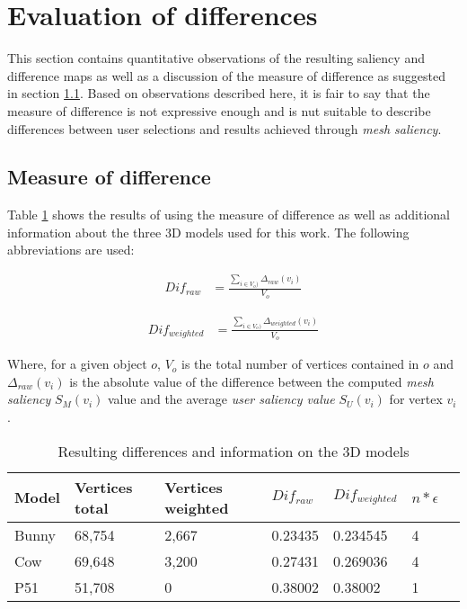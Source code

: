 	\section{Evaluation of differences}
	\label{sec:evaluation_of_differences}
This section contains quantitative observations of the resulting saliency and difference maps as well as a discussion of the measure of difference as suggested in section \ref{sec:measure_of_difference}. Based on observations described here, it is fair to say that the measure of difference is not expressive enough and is nut suitable to describe differences between user selections and results achieved through \textit{mesh saliency}.

		\subsection{Measure of difference}
		\label{sec:measure_of_difference}
Table \ref{tab:results_results_table} shows the results of using the measure of difference as well as additional information about the three 3D models used for this work. The following abbreviations are used:

\begin{align*}
Dif_{raw} &= \frac
	{
		\sum_{i \in V_{o})}
			\Delta_{raw}(v_i)
	}{
		V_{o}
	}
\end{align*}

\begin{align*}
Dif_{weighted} &= \frac
	{
		\sum_{i \in V_{o})}
			\Delta_{weighted}(v_i)
	}{
		V_{o}
	}
\end{align*}

Where, for a given object $o$, $V_{o}$ is the total number of vertices contained in $o$ and $\Delta_{raw}(v_i)$ is the absolute value of the difference between the computed \textit{mesh saliency} $S_{M}(v_i)$ value and the average \textit{user saliency value} $S_{U}(v_i)$ for vertex $v_i$.

\begin{table}[]
\begin{tabular}{l|llllll}
Model &	Vertices total &		Vertices weighted &	$Dif_{raw}$ &			$Dif_{weighted}$ &	$n*\epsilon$	\\ \hline
Bunny &	68,754 &			2,667 &			0.23435 &			0.234545 &		4			\\
Cow &	69,648 &			3,200 &			0.27431 &			0.269036 &		4			\\
P51 &	51,708 &			0 &			0.38002	&			0.38002 &		1				\\
\end{tabular}
\caption{Resulting differences and information on the 3D models}\label{tab:results_results_table}
\end{table}

